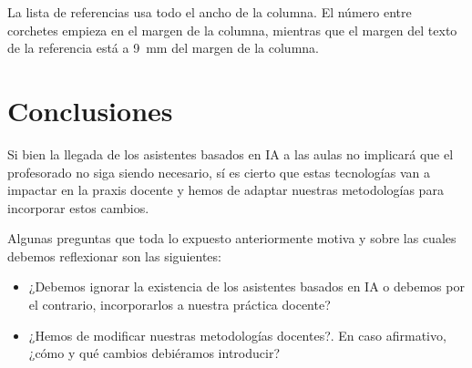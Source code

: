 \documentclass[twocolumn,twoside,a4paper, 10pt]{article}
\begin{document}
La lista de referencias usa todo el ancho de la columna.  El número 
entre corchetes empieza en el margen de la columna, mientras que el margen
del texto de la referencia está a 9~mm del margen de la columna.


\section{Conclusiones}
Si bien la llegada de los asistentes basados en IA a las aulas no implicará que el profesorado no siga siendo
necesario, sí es cierto que estas tecnologías van a impactar en la praxis docente y hemos de adaptar nuestras
metodologías para incorporar estos cambios.

Algunas preguntas que toda lo expuesto anteriormente motiva y sobre las cuales debemos reflexionar son las
siguientes:
\begin{itemize} 
\item ¿Debemos ignorar la existencia de los asistentes basados en IA o debemos por el contrario, incorporarlos a
    nuestra práctica docente?
\item ¿Hemos de modificar nuestras metodologías docentes?. En caso afirmativo, ¿cómo y qué cambios debiéramos
  introducir?
\end {itemize} 

\balance{}


\end{document}

